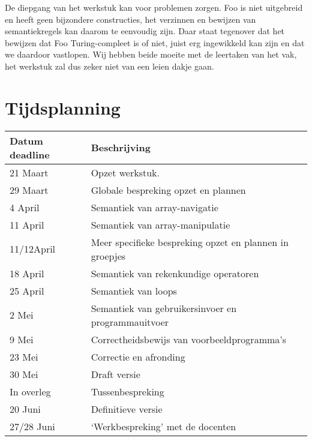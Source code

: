\documentclass[11pt]{article}
\begin{document}
De diepgang van het werkstuk kan voor problemen zorgen. Foo is niet uitgebreid en heeft geen bijzondere constructies, het verzinnen en bewijzen van semantiekregels kan daarom te eenvoudig zijn. Daar staat tegenover dat het bewijzen dat Foo Turing-compleet is of niet, juist erg ingewikkeld kan zijn en dat we daardoor vastlopen.
\newline
Wij hebben beide moeite met de leertaken van het vak, het werkstuk zal dus zeker niet van een leien dakje gaan.

\section{Tijdsplanning}

\begin{center}
    \begin{tabular}{ | l | p{15cm} |}
    \hline
    Datum deadline & Beschrijving \\ \hline
    21 Maart   & Opzet werkstuk. \\ \hline
    29 Maart   & Globale bespreking opzet en plannen \\ \hline
    4 April    & Semantiek van array-navigatie \\ \hline
    11 April   & Semantiek van array-manipulatie \\ \hline
    11/12April & Meer specifieke bespreking opzet en plannen in groepjes \\ \hline
    18 April   & Semantiek van rekenkundige operatoren \\ \hline
    25 April   & Semantiek van loops \\ \hline
    2 Mei      & Semantiek van gebruikersinvoer en programmauitvoer \\ \hline
    9 Mei      & Correctheidsbewijs van voorbeeldprogramma's \\ \hline
    23 Mei     & Correctie en afronding \\ \hline
    30 Mei     & Draft versie \\ \hline
    In overleg & Tussenbespreking \\ \hline
    20 Juni    & Definitieve versie \\ \hline
    27/28 Juni & `Werkbespreking' met de docenten \\ \hline
    \hline
    \end{tabular}
\end{center}


%
\end{document}
